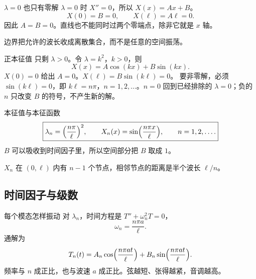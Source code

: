 \documentclass[fontset=windows, chinese, 10pt, xcolor=dvipsnames]{beamer}
\begin{document}
\begin{frame}{$\lambda=0$ 也只有零解}
  $\lambda=0$ 时 $X''=0$，所以 $X(x)=Ax+B$。
  \begin{equation*}
    X(0)=B=0,
    \qquad
    X(\ell)=A\ell=0.
  \end{equation*}
  因此 $A=B=0$。直线也不能同时过两个零端点，除非它就是 $x$ 轴。
  \vspace{0.4em}

  边界把允许的波长收成离散集合，而不是任意的空间振荡。
\end{frame}

\begin{frame}{正本征值}
  只剩 $\lambda>0$。令 $\lambda=k^2$，$k>0$，则
  \begin{equation*}
    X(x)=A\cos(kx)+B\sin(kx).
  \end{equation*}
  $X(0)=0$ 给出 $A=0$。$X(\ell)=B\sin(k\ell)=0$。
  要非零解，必须 $\sin(k\ell)=0$，即 $k\ell=n\pi$，$n=1,2,\ldots$。$n=0$ 回到已经排除的 $\lambda=0$；负的 $n$ 只改变 $B$ 的符号，不产生新的解。
\end{frame}

\begin{frame}{本征值与本征函数}
  \begin{equation*}
    \boxed{\lambda_n=\Bigl(\frac{n\pi}{\ell}\Bigr)^2,
    \qquad
    X_n(x)=\sin\Bigl(\frac{n\pi x}{\ell}\Bigr),
    \qquad n=1,2,\ldots.}
  \end{equation*}
  $B$ 可以吸收到时间因子里，所以空间部分把 $B$ 取成 $1$。
  \vspace{0.3em}

  $X_n$ 在 $(0,\ell)$ 内有 $n-1$ 个节点，相邻节点的距离是半个波长 $\ell/n$。
\end{frame}

\subsection{时间因子与级数}

\begin{frame}{每个模态怎样振动}
  对 $\lambda_n$，时间方程是 $T''+\omega_n^2 T=0$，
  \begin{equation*}
    \omega_n=\frac{n\pi a}{\ell}.
  \end{equation*}
  通解为
  \begin{equation*}
    T_n(t)=A_n\cos\Bigl(\frac{n\pi a t}{\ell}\Bigr)
           +B_n\sin\Bigl(\frac{n\pi a t}{\ell}\Bigr).
  \end{equation*}
  频率与 $n$ 成正比，也与波速 $a$ 成正比。弦越短、张得越紧，音调越高。
\end{frame}
\end{document}
